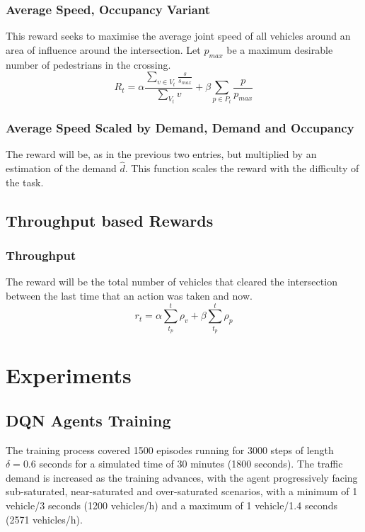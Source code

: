 \documentclass[conference]{IEEEtran}
\begin{document}
\subsubsection{Average Speed, Occupancy Variant}
This reward seeks to maximise the average joint speed of all vehicles around an area of influence around the intersection. Let $p_{max}$ be a maximum desirable number of pedestrians in the crossing.
\begin{equation}
    R_t =   \alpha \frac{ \sum_{v \in V_t} \frac{s}{s_{max}}}{\sum_{V_t} v} + \beta \sum_{p \in P_t} \frac{p}{p_{max}}
\label{eq:avgspeed_occ}
\end{equation}

\subsubsection{Average Speed Scaled by Demand, Demand and Occupancy}
The reward will be, as in the previous two entries, but multiplied by an estimation of the demand $\hat{d}$. This function scales the reward with the difficulty of the task.

\subsection{Throughput based Rewards}
\subsubsection{Throughput}
The reward will be the total number of vehicles that cleared the intersection between the last time that an action was taken and now.
\begin{equation}
    r_t = \alpha \sum_{t_p}^t \rho_v + \beta \sum_{t_p}^t \rho_p
\label{eq:throughput}
\end{equation}


\section{Experiments}

\subsection{DQN Agents Training}
The training process covered 1500 episodes running for 3000 steps of length $\delta=0.6$ seconds for a simulated time of 30 minutes (1800 seconds).
The traffic demand is increased as the training advances, with the agent progressively facing sub-saturated, near-saturated and over-saturated scenarios, with a minimum of 1 vehicle/3 seconds (1200 vehicles/h) and a maximum of 1 vehicle/1.4 seconds (2571 vehicles/h).
\end{document}
